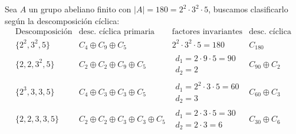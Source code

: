 \begin{ejemplo}
    Sea $A$ un grupo abeliano finito con $|A| = 180 = 2^2\cdot 3^2\cdot 5$, buscamos clasificarlo según la descomposición cíclica:
    \begin{equation*}
        \begin{array}{c|c|c|c}
            \text{Descomposición} & \text{desc. cíclica primaria} & \text{factores invariantes} & \text{desc. cíclica} \\
            \hline
            \{2^2, 3^2, 5\} & C_4\oplus C_9 \oplus C_5 & 2^2\cdot 3^2\cdot 5 = 180 & C_{180} \\
            \hline
            \{2,2,3^2,5\} & C_2\oplus C_2\oplus C_9\oplus C_5 & \begin{array}{c}
                    d_1 = 2\cdot 9\cdot 5 = 90 \\
                    d_2 = 2
            \end{array}& C_{90}\oplus C_2 \\
            \hline
            \{2^3, 3, 3, 5\} & C_4\oplus C_3\oplus C_3\oplus C_5 & \begin{array}{c}
                    d_1 = 2^2\cdot 3\cdot 5 = 60 \\
                    d_2 = 3
            \end{array}& C_{60} \oplus C_3 \\
            \hline
                    \{2,2,3,3,5\} & C_2\oplus C_2\oplus C_3\oplus C_3\oplus C_5 & \begin{array}{c}
                            d_1 = 2\cdot 3\cdot 5 = 30 \\
                            d_2 = 2\cdot 3 = 6
                        \end{array} & C_{30} \oplus C_6
        \end{array}
    \end{equation*}
\end{ejemplo}

